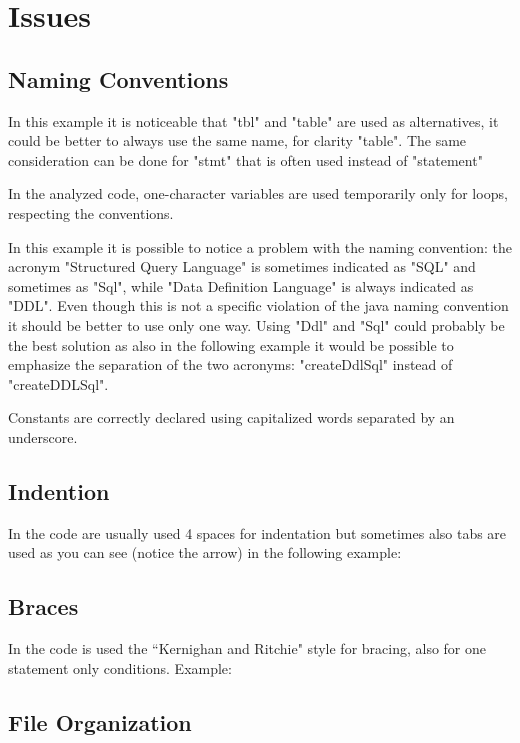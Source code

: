 \documentclass[a4paper]{article}
\begin{document}
\section{Issues}

\subsection{Naming Conventions}

In this example it is noticeable that "tbl" and "table" are used as alternatives, it could be better to always use the same name, for clarity "table".
The same consideration can be done for "stmt" that is often used instead of "statement"

In the analyzed code, one-character variables are used temporarily only for loops, respecting the conventions.

In this example it is possible to notice a problem with the naming convention: the acronym "Structured Query Language" is sometimes indicated as "SQL" and sometimes as "Sql", while "Data Definition Language" is always indicated as "DDL". Even though this is not a specific violation of the java naming convention it should be better to use only one way. Using "Ddl" and "Sql" could probably be the best solution as also in the following example it would be possible to emphasize the separation of the two acronyms: "createDdlSql" instead of "createDDLSql".

Constants are correctly declared using capitalized words separated by an underscore.

\subsection{Indention}

In the code are usually used 4 spaces for indentation but sometimes also tabs are used as you can see (notice the arrow) in the following example:

\subsection{Braces}

In the code is used the “Kernighan and Ritchie" style for bracing, also for one statement only conditions.
Example:

\subsection{File Organization}
\end{document}
